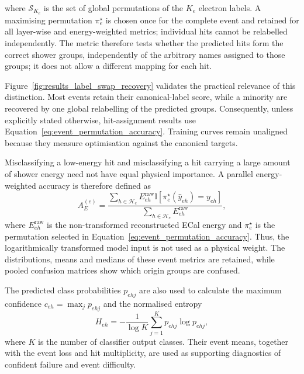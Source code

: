 where \(\mathcal{S}_{K_e}\) is the set of global permutations of the
\(K_e\) electron labels. A maximising permutation \(\pi_e^\star\) is chosen
once for the complete event and retained for all layer-wise and
energy-weighted metrics; individual hits cannot be relabelled independently.
The metric therefore tests whether the predicted hits form the correct shower
groups, independently of the arbitrary names assigned to those groups; it
does not allow a different mapping for each hit.

Figure~\ref{fig:results_label_swap_recovery} validates the practical relevance
of this distinction. Most events retain their canonical-label score, while a
minority are recovered by one global relabelling of the predicted groups.
Consequently, unless explicitly stated otherwise, hit-assignment results use
Equation~\eqref{eq:event_permutation_accuracy}. Training curves remain
unaligned because they measure optimisation against the canonical targets.

Misclassifying a low-energy hit and misclassifying a hit carrying a large
amount of shower energy need not have equal physical importance. A parallel
energy-weighted accuracy is therefore defined as
\begin{equation}
    A_{E}^{(e)}
    =
    \frac{
        \displaystyle\sum_{h \in \mathcal{H}_e}
        E_{eh}^{\mathrm{raw}}
        \mathbb{I}
        \!\left[\pi_e^\star(\widehat{y}_{eh})=y_{eh}\right]
    }{
        \displaystyle\sum_{h \in \mathcal{H}_e}
        E_{eh}^{\mathrm{raw}}
    },
    \label{eq:event_energy_weighted_accuracy}
\end{equation}
where \(E_{eh}^{\mathrm{raw}}\) is the non-transformed reconstructed ECal
energy and \(\pi_e^\star\) is the permutation selected in
Equation~\eqref{eq:event_permutation_accuracy}. Thus, the logarithmically
transformed model input is not used as a physical weight. The distributions,
means and medians of these event metrics are retained, while pooled confusion
matrices show which origin groups are confused.

The predicted class probabilities \(p_{ehj}\) are also used to calculate the
maximum confidence \(c_{eh}=\max_j p_{ehj}\) and the normalised entropy
\begin{equation}
    H_{eh}
    =
    -\frac{1}{\log K}
    \sum_{j=1}^{K} p_{ehj}\log p_{ehj},
    \label{eq:normalised_prediction_entropy}
\end{equation}
where \(K\) is the number of classifier output classes. Their event means,
together with the event loss and hit multiplicity, are used as supporting
diagnostics of confident failure and event difficulty.

